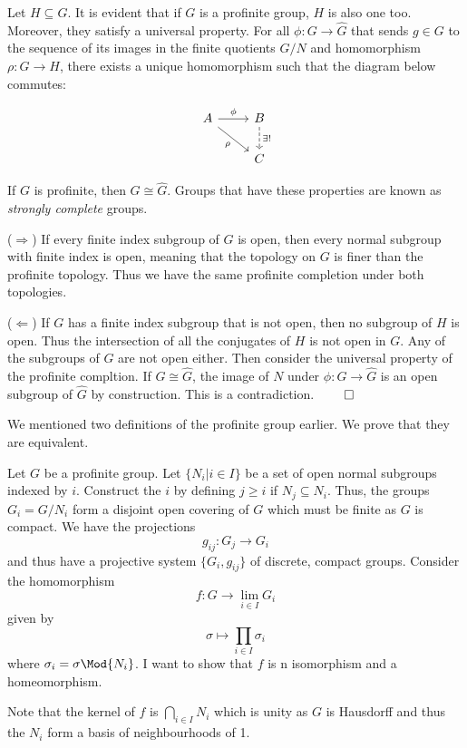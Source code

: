 \documentclass[a4paper, 12pt,oneside,openany]{book}
\begin{document}
Let $H \subseteq G$. It is evident that if $G$ is a profinite group, $H$ is also one too. Moreover, they satisfy a universal property. For all $ \phi: G\to \hat{G}$ that sends $g \in G$ to the sequence of its images in the finite quotients $G/N$ and homomorphism $\rho: G\to H$, there exists a unique homomorphism such that the diagram below commutes:

\[
\begin{tikzcd}
    A \arrow{r}{\phi} \arrow[swap]{dr}{\rho} & B \arrow[dashed]{d}{\exists !} \\
     & C
\end{tikzcd}
\]

If $G$ is profinite, then $G \cong \hat{G}$. Groups that have these properties are known as \emph{strongly complete} groups.


 ($\Rightarrow$) If every finite index subgroup of $G$ is open, then every normal subgroup with finite index is open, meaning that the topology on $G$ is finer than the profinite topology. Thus we have the same profinite completion under both topologies.

($\Leftarrow$) If $G$ has a finite index subgroup that is not open, then no subgroup of $H$ is open. Thus the intersection of all the conjugates of $H$ is not open in $G$. Any of the subgroups of $G$ are not open either. Then consider the universal property of the profinite compltion. If $G \cong \hat{G}$, the image of $N$ under $\phi: G \to \hat{G}$ is an open subgroup of $\hat{G}$ by construction. This is a contradiction. $\qed$

We mentioned two definitions of the profinite group earlier. We prove that they are equivalent.

 Let $G$ be a profinite group. Let $\{N_i | i \in I\}$ be a set of open normal subgroups indexed by $i$. Construct the $i$ by defining $j \geq i$ if $N_j \subseteq N_i$. Thus, the groups $G_i = G/N_i$ form a disjoint open covering of $G$ which must be finite as $G$ is compact. We have the projections $$g_{ij}: G_j \to G_i$$ and thus have a projective system $\{G_i, g_{ij}\}$ of discrete, compact groups. Consider the homomorphism $$f:G \to \lim\limits_{i\in I} G_i $$ given by $$\sigma \mapsto \prod\limits_{i\in I} \sigma_i$$ where $\sigma_i = \sigma \Mod{N_i}$. I want to show that $f$ is n isomorphism and a homeomorphism.

Note that the kernel of $f$ is $\bigcap\limits_{i\in I} N_i$ which is unity as $G$ is Hausdorff and thus the $N_i$ form a basis of neighbourhoods of 1.
\end{document}
